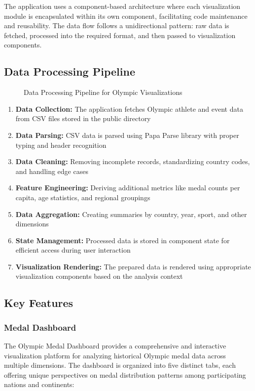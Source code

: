 \documentclass[a4paper, 12pt]{article}
\begin{document}
The application uses a component-based architecture where each visualization module is encapsulated within its own component, facilitating code maintenance and reusability. The data flow follows a unidirectional pattern: raw data is fetched, processed into the required format, and then passed to visualization components.

\subsection{Data Processing Pipeline}
\begin{figure}[h]
    \centering
    \caption{Data Processing Pipeline for Olympic Visualizations}
\end{figure}

\begin{enumerate}[leftmargin=*]
    \item \textbf{Data Collection:} The application fetches Olympic athlete and event data from CSV files stored in the public directory
    \item \textbf{Data Parsing:} CSV data is parsed using Papa Parse library with proper typing and header recognition
    \item \textbf{Data Cleaning:} Removing incomplete records, standardizing country codes, and handling edge cases
    \item \textbf{Feature Engineering:} Deriving additional metrics like medal counts per capita, age statistics, and regional groupings
    \item \textbf{Data Aggregation:} Creating summaries by country, year, sport, and other dimensions
    \item \textbf{State Management:} Processed data is stored in component state for efficient access during user interaction
    \item \textbf{Visualization Rendering:} The prepared data is rendered using appropriate visualization components based on the analysis context
\end{enumerate}

\subsection{Key Features}
\subsubsection{Medal Dashboard}
The Olympic Medal Dashboard provides a comprehensive and interactive visualization platform for analyzing historical Olympic medal data across multiple dimensions. The dashboard is organized into five distinct tabs, each offering unique perspectives on medal distribution patterns among participating nations and continents:
\end{document}
